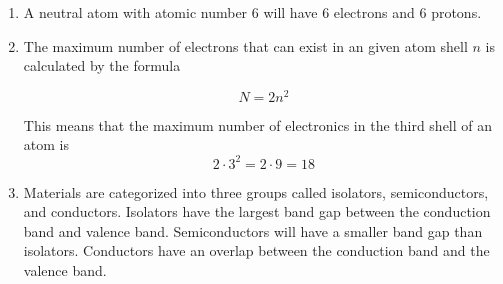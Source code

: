 \documentclass[fleqn]{article}
\begin{document}
\begin{enumerate}[label=\textbf{\arabic*.}]

\item A neutral atom with atomic number 6 will have 6 electrons and 6 protons. 
  
\item The maximum number of electrons that can exist in an given atom shell $ n $ is calculated by the formula

\[
  N = 2n^2
\]

This means that the maximum number of electronics in the third shell of an atom is
\[ 
  2 \cdot 3^2 = 2 \cdot 9 = 18
\]

\item
Materials are categorized into three groups called isolators, semiconductors, and conductors. Isolators have the largest band gap between the conduction band and valence band. Semiconductors will have a smaller band gap than isolators. Conductors have an overlap between the conduction band and the valence band.
  
\end{enumerate}
\end{document}
